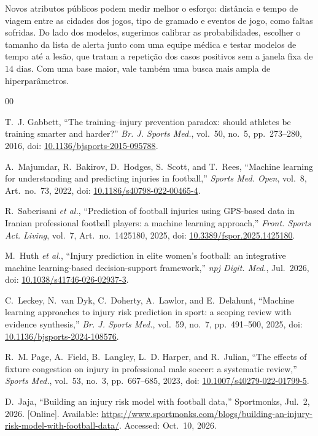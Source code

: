 \documentclass[conference]{IEEEtran}
\newcommand{\doilink}[1]{doi: \href{https://doi.org/#1}{#1}}
\begin{document}
Novos atributos públicos podem medir melhor o esforço: distância e tempo de viagem entre as cidades dos jogos, tipo de gramado e eventos de jogo, como faltas sofridas. Do lado dos modelos, sugerimos calibrar as probabilidades, escolher o tamanho da lista de alerta junto com uma equipe médica e testar modelos de tempo até a lesão, que tratam a repetição dos casos positivos sem a janela fixa de $14$ dias. Com uma base maior, vale também uma busca mais ampla de hiperparâmetros.


\begin{thebibliography}{00}

T.~J. Gabbett, ``The training--injury prevention paradox: should athletes be training smarter and harder?'' \textit{Br. J. Sports Med.}, vol.~50, no.~5, pp.~273--280, 2016, \doilink{10.1136/bjsports-2015-095788}.

A.~Majumdar, R.~Bakirov, D.~Hodges, S.~Scott, and T.~Rees, ``Machine learning for understanding and predicting injuries in football,'' \textit{Sports Med. Open}, vol.~8, Art.~no.~73, 2022, \doilink{10.1186/s40798-022-00465-4}.

R.~Saberisani \textit{et al.}, ``Prediction of football injuries using GPS-based data in Iranian professional football players: a machine learning approach,'' \textit{Front. Sports Act. Living}, vol.~7, Art.~no.~1425180, 2025, \doilink{10.3389/fspor.2025.1425180}.

M.~Huth \textit{et al.}, ``Injury prediction in elite women's football: an integrative machine learning-based decision-support framework,'' \textit{npj Digit. Med.}, Jul.~2026, \doilink{10.1038/s41746-026-02937-3}.

C.~Leckey, N.~van Dyk, C.~Doherty, A.~Lawlor, and E.~Delahunt, ``Machine learning approaches to injury risk prediction in sport: a scoping review with evidence synthesis,'' \textit{Br. J. Sports Med.}, vol.~59, no.~7, pp.~491--500, 2025, \doilink{10.1136/bjsports-2024-108576}.

R.~M. Page, A.~Field, B.~Langley, L.~D. Harper, and R.~Julian, ``The effects of fixture congestion on injury in professional male soccer: a systematic review,'' \textit{Sports Med.}, vol.~53, no.~3, pp.~667--685, 2023, \doilink{10.1007/s40279-022-01799-5}.

D.~Jaja, ``Building an injury risk model with football data,'' Sportmonks, Jul.~2, 2026. [Online]. Available: \url{https://www.sportmonks.com/blogs/building-an-injury-risk-model-with-football-data/}. Accessed: Oct.~10, 2026.


\end{thebibliography}
\end{document}
